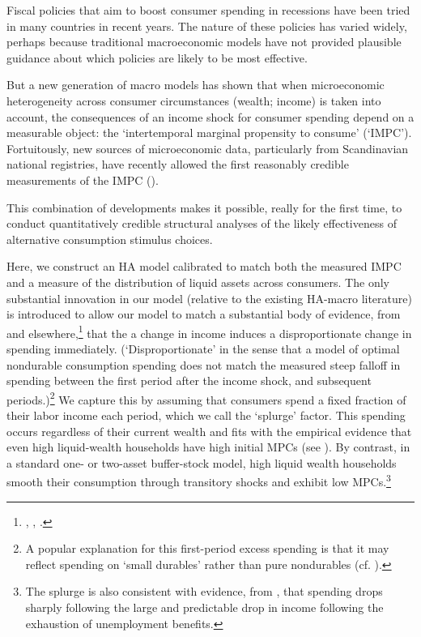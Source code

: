 \documentclass[../HAFiscal]{subfiles}
\begin{document}
Fiscal policies that aim to boost consumer spending in recessions have been tried in many countries in recent years.  The nature of these policies has varied widely, perhaps because traditional macroeconomic models have not provided plausible guidance about which policies are likely to be most effective.

But a new generation of macro models has shown that when microeconomic heterogeneity across consumer circumstances (wealth; income) is taken into account, the consequences of an income shock for consumer spending depend on a measurable object: the `intertemporal marginal propensity to consume' (`IMPC').  Fortuitously, new sources of microeconomic data, particularly from Scandinavian national registries, have recently allowed the first reasonably credible measurements of the IMPC (\cite{fagereng_mpc_2021}).

This combination of developments makes it possible, really for the first time, to conduct quantitatively credible structural analyses of the likely effectiveness of alternative consumption stimulus choices.

	Here, we construct an HA model calibrated to match both the measured IMPC and a measure of the distribution of liquid assets across consumers.  The only substantial innovation in our model (relative to the existing HA-macro literature) is introduced to allow our model to match a substantial body of evidence, from \cite{fagereng_mpc_2021} and elsewhere,\footnote{\cite{parker2013consumer}, \cite{ganongConsumer2019}, \cite{olafsson2018liquid}.} that the a change in income induces a disproportionate change in spending immediately.  (`Disproportionate' in the sense that a model of optimal nondurable consumption spending does not match the measured steep falloff in spending between the first period after the income shock, and subsequent periods.)\footnote{A popular explanation for this first-period excess spending is that it may reflect spending on `small durables' rather than pure nondurables (cf. \cite{laibson2022simple}).}  We capture this by assuming that consumers spend a fixed fraction of their labor income each period, which we call the `splurge' factor. This spending occurs regardless of their current wealth and fits with the empirical evidence that even high liquid-wealth households have high initial MPCs (see \cite{crawleyMicroMacro}).  By contrast, in a standard one- or two-asset buffer-stock model, high liquid wealth households smooth their consumption through transitory shocks and exhibit low MPCs.\footnote{The splurge is also consistent with evidence, from \cite{ganongConsumer2019}, that spending drops sharply following the large and predictable drop in income following the exhaustion of unemployment benefits.}
\end{document}

